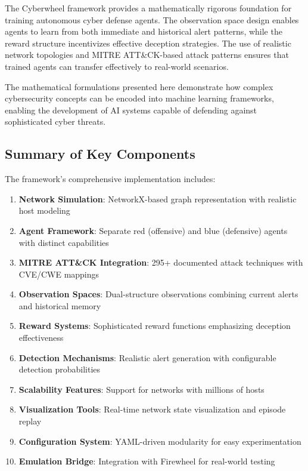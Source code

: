 \documentclass[12pt,a4paper]{article}
\begin{document}
The Cyberwheel framework provides a mathematically rigorous foundation for training autonomous cyber defense agents. The observation space design enables agents to learn from both immediate and historical alert patterns, while the reward structure incentivizes effective deception strategies. The use of realistic network topologies and MITRE ATT\&CK-based attack patterns ensures that trained agents can transfer effectively to real-world scenarios.

The mathematical formulations presented here demonstrate how complex cybersecurity concepts can be encoded into machine learning frameworks, enabling the development of AI systems capable of defending against sophisticated cyber threats.

\subsection{Summary of Key Components}
The framework's comprehensive implementation includes:

\begin{enumerate}
    \item \textbf{Network Simulation}: NetworkX-based graph representation with realistic host modeling
    \item \textbf{Agent Framework}: Separate red (offensive) and blue (defensive) agents with distinct capabilities
    \item \textbf{MITRE ATT\&CK Integration}: 295+ documented attack techniques with CVE/CWE mappings
    \item \textbf{Observation Spaces}: Dual-structure observations combining current alerts and historical memory
    \item \textbf{Reward Systems}: Sophisticated reward functions emphasizing deception effectiveness
    \item \textbf{Detection Mechanisms}: Realistic alert generation with configurable detection probabilities
    \item \textbf{Scalability Features}: Support for networks with millions of hosts
    \item \textbf{Visualization Tools}: Real-time network state visualization and episode replay
    \item \textbf{Configuration System}: YAML-driven modularity for easy experimentation
    \item \textbf{Emulation Bridge}: Integration with Firewheel for real-world testing
\end{enumerate}
\end{document}
